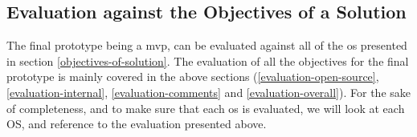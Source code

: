 \documentclass{report}
\begin{document}

\subsection{Evaluation against the Objectives of a Solution}

The final prototype being a \gls{mvp}, can be evaluated against all of the \gls{os} presented in section \ref{objectives-of-solution}. The evaluation of all the objectives for the final prototype is mainly covered in the above sections (\ref{evaluation-open-source}, \ref{evaluation-internal}, \ref{evaluation-comments} and \ref{evaluation-overall}). For the sake of completeness, and to make sure that each \gls{os} is evaluated, we will look at each OS, and reference to the evaluation presented above. 


\end{document}
